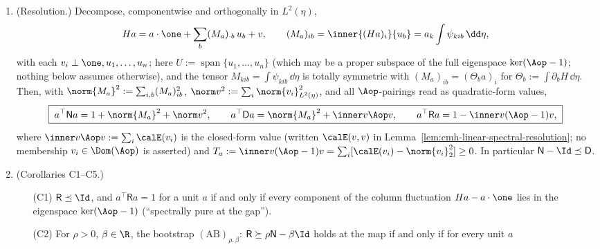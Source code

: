\documentclass[../main.tex]{subfiles}
\begin{document}
\begin{theorem}
\begin{enumerate}[label=(\alph*),leftmargin=2.2em]
with $\int\inner{H^{-1}\nabla f}{\nabla f}\dd\eta<\infty$ (the class $\mathfrak B$ of
Lemma~\ref{lem:sol-clsr-form-membership}, every member of which lies in $\Dom(\calE)$; in
particular every core element and every $u_b$).
Consequently $(A+Q)a$ is orthogonal to every $u_b$:
$\int u_b\,\bigl((A+Q)a\bigr)_i\,\dd\eta=0$ for all $i,b$.  This weak form is exactly the
column equation asserted by Lemma~\ref{lem:cmh-linear-spectral-resolution}; no membership
$(Ha)_i\in\Dom(\Aop)$ is asserted (Remark~\ref{rem:sol-clsr-weak-vs-strong}).
\item\label{it:sol-clsr-d} \textup{(Resolution.)}  Decompose, componentwise and orthogonally in
$L^2(\eta)$,
\[
  Ha=a\cdot\one+\sum_b(M_a)_{\cdot b}\,u_b+v,
  \qquad
  (M_a)_{ib}=\inner{(Ha)_i}{u_b}=a_k\int\psi_{kib}\,\dd\eta,
\]
with each $v_i\perp\one,u_1,\dots,u_n$; here $U:=\operatorname{span}\{u_1,\dots,u_n\}$ (which
may be a proper subspace of the full eigenspace $\ker(\Aop-1)$; nothing below assumes
otherwise), and the tensor $M_{kib}=\int\psi_{kib}\,\dd\eta$ is totally symmetric with
$(M_a)_{ib}=(\Theta_ba)_i$ for $\Theta_b:=\int\partial_bH\,\dd\eta$.  Then, with
$\norm{M_a}^2:=\sum_{i,b}(M_a)_{ib}^2$, $\norm v^2:=\sum_i\norm{v_i}_{L^2(\eta)}^2$, and all
$\Aop$-pairings read as quadratic-form values,
\begin{equation}
  \boxed{\;
  a^\top\mathsf Na=1+\norm{M_a}^2+\norm v^2,\qquad
  a^\top\mathsf Da=\norm{M_a}^2+\inner v{\Aop v},\qquad
  a^\top\mathsf Ra=1-\inner v{(\Aop-1)v},\;}
  \label{eq:sol-clsr-resolution}
\end{equation}
where $\inner v{\Aop v}:=\sum_i\calE(v_i)$ is the closed-form value (written $\calE(v,v)$ in
Lemma~\ref{lem:cmh-linear-spectral-resolution}; no membership $v_i\in\Dom(\Aop)$ is asserted)
and $T_a:=\inner v{(\Aop-1)v}=\sum_i[\calE(v_i)-\norm{v_i}_2^2]\ge0$.  In particular
$\mathsf N-\Id\preceq\mathsf D$.
\item\label{it:sol-clsr-e} \textup{(Corollaries C1--C5.)}
\begin{itemize}[leftmargin=1.6em]
\item[\textup{(C1)}] $\mathsf R\preceq\Id$, and $a^\top\mathsf Ra=1$ for a unit $a$ if and only
if every component of the column fluctuation $Ha-a\cdot\one$ lies in the eigenspace
$\ker(\Aop-1)$ (``spectrally pure at the gap'').
\item[\textup{(C2)}] For $\rho>0$, $\beta\in\R$, the bootstrap
$(\mathrm{AB})_{\rho,\beta}$: $\mathsf R\succeq\rho\mathsf N-\beta\Id$ holds at the map if and
only if for every unit $a$
\begin{equation}

\end{equation}
\end{itemize}
\end{enumerate}
\end{theorem}
\end{document}
